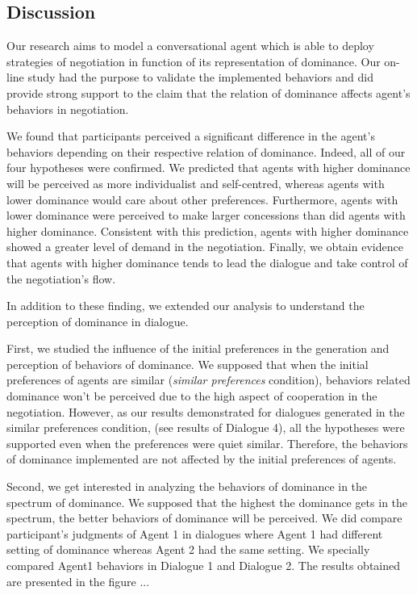 \documentclass{llncs}
\begin{document}
			 \subsection{Discussion}

			 Our research aims to model a conversational agent which is able to deploy strategies of negotiation in function of its representation of dominance. Our on-line study had the purpose to validate the implemented behaviors and did provide strong support to the claim that the relation of dominance affects agent's behaviors in negotiation.
			 
			 We found that participants perceived a significant difference in the agent's behaviors depending on their respective relation of dominance.  
			 Indeed, all of our four hypotheses were confirmed. We predicted that agents with higher dominance will be perceived as more individualist and self-centred, whereas agents with lower dominance would care about other preferences. Furthermore, agents with lower dominance were perceived to make larger concessions than did agents with higher dominance. Consistent with this prediction, agents with higher dominance showed a greater level of demand in the negotiation. Finally, we obtain evidence that agents with higher dominance tends to lead the dialogue and take control of the negotiation's flow. 
			 
			 In addition to these finding, we extended our analysis to understand the perception of dominance in dialogue.
			
			 First, we studied the influence of the initial preferences in the generation and perception of behaviors of dominance.
			 We supposed that when the initial preferences of agents are similar (\textit{similar preferences} condition), behaviors related dominance won't be perceived due to the high aspect of cooperation in the negotiation. However, as our results demonstrated for dialogues generated in the similar preferences condition, (see results of Dialogue 4), all the hypotheses were supported even when the preferences were quiet similar. Therefore, the behaviors of dominance implemented are not affected by the initial preferences of agents.
			 
			 Second, we get interested in analyzing the behaviors of dominance in the spectrum of dominance. We supposed that the highest the dominance gets in the spectrum, the better behaviors of dominance will be perceived. We did compare participant's judgments of Agent 1 in dialogues where Agent 1 had different setting of dominance whereas Agent 2 had the same setting. We specially compared Agent1 behaviors in Dialogue 1 and Dialogue 2. The results obtained are presented in the figure ... 
			 
\end{document}
